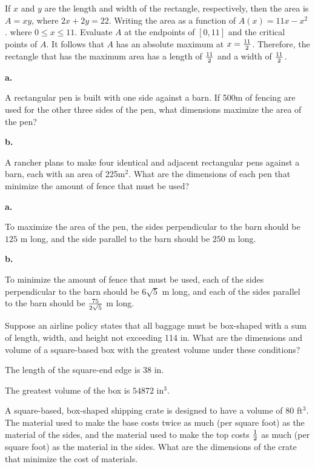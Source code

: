 If $x$ and $y$ are the length and width of the rectangle,
respectively, then the area is $A=xy$, where $2x + 2y = 22$.
Writing the area as a function of $A(x) = 11x-x^2$. where
$0 \le x \le 11$. Evaluate $A$ at the endpoints of $[0, 11]$
and the critical points of $A$. It follows that $A$ has
an absolute maximum at $x = {11 \over 2}$. Therefore, the
rectangle that has the maximum area has a length of ${11 \over 2}$
and a width of ${11 \over 2}$.

{\par \bf a.}
A rectangular pen is built with one side against
a barn. If 500m of fencing are used for the other three sides
of the pen, what dimensions maximize the area of the pen?

{\par \bf b.}
A rancher plans to make four identical and adjacent rectangular pens
against a barn, each with an area of 225m$^2$. What are the dimensions
of each pen that minimize the amount of fence that must be used?

{\par \bf a.}
To maximize the area of the pen, the sides perpendicular to the barn should
be $125$ m long, and the side parallel to the barn should be $250$ m long.

{\par \bf b.}
To minimize the amount of fence that must be used, each of the sides
perpendicular to the barn should be $6 \sqrt{5}$ m long, and
each of the sides parallel to the barn should be ${75 \over 2 \sqrt{5}}$
m long.

Suppose an airline policy states that all baggage must be
box-shaped with a sum of length, width, and height not exceeding
114 in. What are the dimensions and volume of a square-based
box with the greatest volume under these conditions?

The length of the square-end edge is $38$ in.

\par

The greatest volume of the box is $54872$ in$^3$.

A square-based, box-shaped shipping crate is designed to
have a volume of 80 ft$^3$. The material used to make the base
costs twice as much (per square foot) as the material of the sides,
and the material used to make the top costs ${1 \over 2}$ as
much (per square foot) as the material in the sides. What
are the dimensions of the crate that minimize the cost of
materials.

